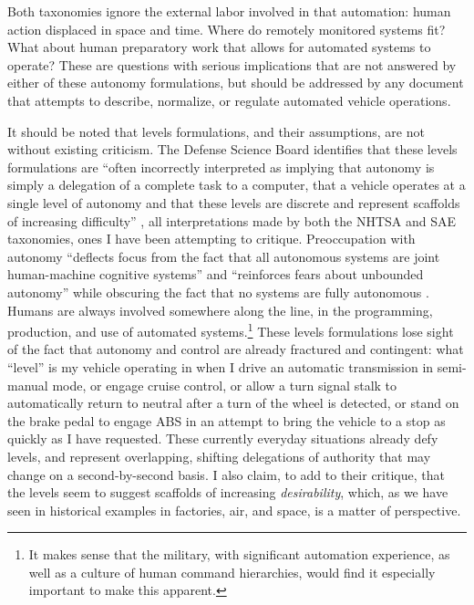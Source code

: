 
Both
taxonomies ignore the external labor involved in that automation:
human action displaced in space and time. Where do remotely monitored
systems fit? What about human preparatory work that allows for
automated systems to operate? These are questions with serious
implications that are not
answered by either of these autonomy formulations, but should be
addressed by any document that attempts to describe, normalize, or
regulate automated vehicle operations. 


It should be noted that levels formulations, and their assumptions, are not without
existing criticism. The Defense Science Board identifies that these levels formulations are
``often incorrectly 
interpreted as implying that autonomy is simply a delegation of a
complete task to a computer, that a vehicle operates at a single level
of autonomy and that these levels are discrete and represent scaffolds
of increasing difficulty'' \cite[p. 23-24]{DSB}, all interpretations
made by both the 
NHTSA and SAE taxonomies, ones I have been
attempting to critique. Preoccupation with autonomy ``deflects focus from the fact that all
autonomous systems are joint human-machine cognitive systems'' and
``reinforces fears about unbounded autonomy'' while obscuring
the fact that no systems are fully autonomous \cite[p. 24]{DSB}. Humans are always
involved somewhere along the line, in the programming, production,
and use of automated systems.\footnote{It makes sense that the
  military, with significant automation experience, as well as
a culture of
human command hierarchies, would find it especially important to make
this apparent.} These levels
formulations lose sight of the fact that autonomy and control are
already fractured and contingent:  what ``level'' is my vehicle
operating in when I drive an automatic transmission in semi-manual
mode, or engage cruise control, or allow a turn signal stalk to
automatically return to neutral after a turn of the wheel is detected,
or stand on the brake pedal to engage ABS in an attempt to bring the
vehicle to a stop as quickly as I have requested. These currently
everyday situations already defy levels, and represent overlapping, shifting
delegations of authority that may change on a second-by-second basis.
I also claim, to add to their critique, that the
levels seem to suggest scaffolds of increasing \emph{desirability},
which, as we have seen in historical examples in factories, air, and
space, is a matter of perspective. 

